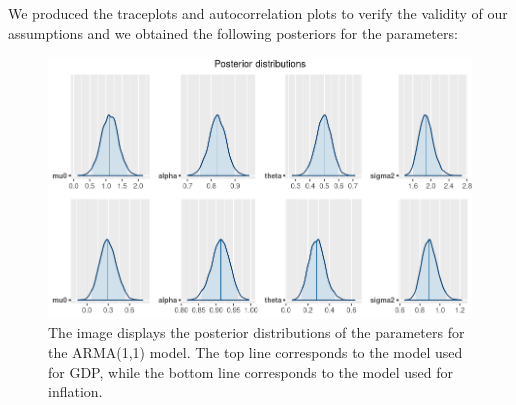 We produced the traceplots and autocorrelation plots to verify the validity of our assumptions and we obtained the following posteriors for the parameters: \\
\begin{figure}[h]
    \centering
    \includegraphics[width=\textwidth]{../Images/4-ARMA/posteriors.png}
    \caption{The image displays the posterior distributions of the parameters for the ARMA(1,1) model. The top line corresponds to the model used for GDP, while the bottom line corresponds to the model used for inflation.}
    \label{fig:ARMA_posteriors}
\end{figure} \\


